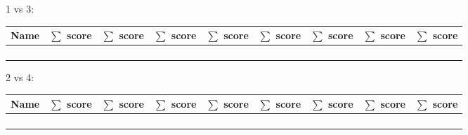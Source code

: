 \documentclass{article}
\begin{document}
\begin{center}
    1 vs 3: 
    \begin{tabular}{r|c|c|c|c|c|c|c|c}
        \toprule
        Name      & \(\sum\) score & \(\sum\) score & \(\sum\) score & \(\sum\) score & \(\sum\) score & \(\sum\) score & \(\sum\) score & \(\sum\) score\\
        \midrule
                  &                &                &                &                &                &                &                & \\
                  &                &                &                &                &                &                &                & \\
        \midrule
                  &                &                &                &                &                &                &                & \\
                  &                &                &                &                &                &                &                & \\
        \bottomrule
    \end{tabular}
\end{center}

\begin{center}
    2 vs 4: 
    \begin{tabular}{r|c|c|c|c|c|c|c|c}
        \toprule
        Name      & \(\sum\) score & \(\sum\) score & \(\sum\) score & \(\sum\) score & \(\sum\) score & \(\sum\) score & \(\sum\) score & \(\sum\) score\\
        \midrule
                  &                &                &                &                &                &                &                & \\
                  &                &                &                &                &                &                &                & \\
        \midrule
                  &                &                &                &                &                &                &                & \\
                  &                &                &                &                &                &                &                & \\
        \bottomrule
    \end{tabular}
\end{center}
\end{document}
